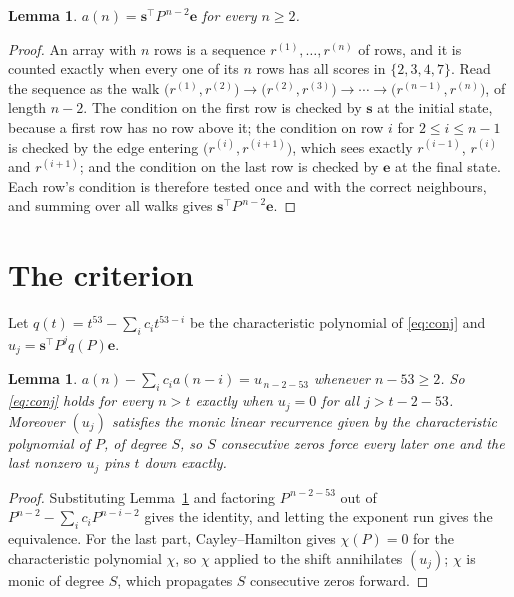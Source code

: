 \documentclass[11pt,a4paper]{article}
\theoremstyle{plain}
\newtheorem{lemma}[theorem]{Lemma}
\theoremstyle{definition}
\begin{document}
\begin{lemma}\label{lem:walk}
$a(n)=\mathbf{s}^{\!\top}P^{\,n-2}\mathbf{e}$ for every $n\ge2$.
\end{lemma}

\begin{proof}
An array with $n$ rows is a sequence $r^{(1)},\dots,r^{(n)}$ of rows, and it is counted
exactly when every one of its $n$ rows has all scores in $\{2,3,4,7\}$. Read the sequence as the
walk $\bigl(r^{(1)},r^{(2)}\bigr)\to\bigl(r^{(2)},r^{(3)}\bigr)\to\cdots\to
\bigl(r^{(n-1)},r^{(n)}\bigr)$, of length $n-2$. The condition on the first row is
checked by $\mathbf{s}$ at the initial state, because a first row has no row above it; the
condition on row $i$ for $2\le i\le n-1$ is checked by the edge entering
$\bigl(r^{(i)},r^{(i+1)}\bigr)$, which sees exactly $r^{(i-1)}$, $r^{(i)}$ and
$r^{(i+1)}$; and the condition on the last row is checked by $\mathbf{e}$ at the final
state. Each row's condition is therefore tested once and with the correct neighbours, and
summing over all walks gives $\mathbf{s}^{\!\top}P^{\,n-2}\mathbf{e}$.
\end{proof}

\section{The criterion}

Let $q(t)=t^{53}-\sum_i c_i t^{53-i}$ be the characteristic polynomial of
\eqref{eq:conj} and $u_j=\mathbf{s}^{\!\top}P^{j}q(P)\mathbf{e}$.

\begin{lemma}\label{lem:crit}
$a(n)-\sum_i c_i a(n-i)=u_{\,n-2-53}$ whenever $n-53\ge2$. So \eqref{eq:conj}
holds for every $n>t$ exactly when $u_j=0$ for all $j>t-2-53$. Moreover $(u_j)$
satisfies the monic linear recurrence given by the characteristic polynomial of $P$, of
degree $S$, so $S$ consecutive zeros force every later one and the last nonzero $u_j$ pins
$t$ down exactly.
\end{lemma}

\begin{proof}
Substituting Lemma~\ref{lem:walk} and factoring $P^{\,n-2-53}$ out of
$P^{n-2}-\sum_i c_i P^{n-i-2}$ gives the identity, and letting the exponent run gives the
equivalence. For the last part, Cayley--Hamilton gives $\chi(P)=0$ for the characteristic
polynomial $\chi$, so $\chi$ applied to the shift annihilates $(u_j)$; $\chi$ is monic of
degree $S$, which propagates $S$ consecutive zeros forward.
\end{proof}
\end{document}

